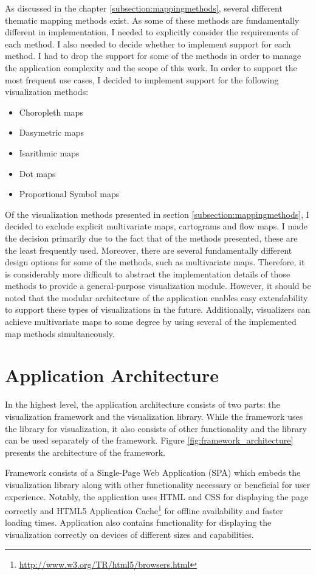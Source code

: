 As discussed in the chapter \ref{subsection:mappingmethods}, several different thematic mapping methods exist. As some of these methods are fundamentally different in implementation, I needed to explicitly consider the requirements of each method. I also needed to decide whether to implement support for each method. I had to drop the support for some of the methods in order to manage the application complexity and the scope of this work. In order to support the most frequent use cases, I decided to implement support for the following visualization methods:

\begin{itemize}
	\item Choropleth maps
	\item Dasymetric maps
	\item Isarithmic maps
	\item Dot maps
	\item Proportional Symbol maps
\end{itemize}

Of the visualization methods presented in section \ref{subsection:mappingmethods}, I decided to exclude explicit multivariate maps, cartograms and flow maps. I made the decision primarily due to the fact that of the methods presented, these are the least frequently used. Moreover, there are several fundamentally different design options for some of the methods, such as multivariate maps. Therefore, it is considerably more difficult to abstract the implementation details of those methods to provide a general-purpose visualization module. However, it should be noted that the modular architecture of the application enables easy extendability to support these types of visualizations in the future. Additionally, visualizers can achieve multivariate maps to some degree by using several of the implemented map methods simultaneously.

\section{Application Architecture}

In the highest level, the application architecture consists of two parts: the visualization framework and the visualization library. While the framework uses the library for visualization, it also consists of other functionality and the library can be used separately of the framework. Figure \ref{fig:framework_architecture} presents the architecture of the framework.

Framework consists of a Single-Page Web Application (SPA) which embeds the visualization library along with other functionality necessary or beneficial for user experience. Notably, the application uses HTML and CSS for displaying the page correctly and HTML5 Application Cache\footnote{\url{http://www.w3.org/TR/html5/browsers.html}} for offline availability and faster loading times. Application also contains functionality for displaying the visualization correctly on devices of different sizes and capabilities.

